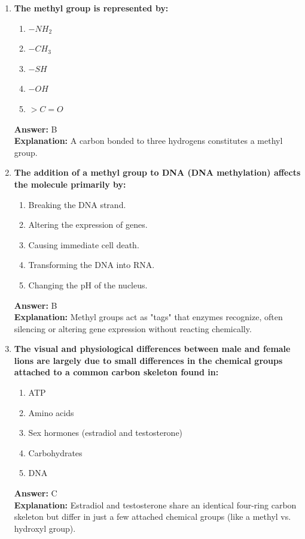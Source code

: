 \documentclass[11pt, a4paper]{article}
\begin{document}
\begin{enumerate}
\item \textbf{The methyl group is represented by:}
\begin{enumerate}[label=\Alph*.]
    \item $-NH_2$
    \item $-CH_3$
    \item $-SH$
    \item $-OH$
    \item $>C=O$
\end{enumerate}
\textbf{Answer:} B \\
\textbf{Explanation:} A carbon bonded to three hydrogens constitutes a methyl group.

\item \textbf{The addition of a methyl group to DNA (DNA methylation) affects the molecule primarily by:}
\begin{enumerate}[label=\Alph*.]
    \item Breaking the DNA strand.
    \item Altering the expression of genes.
    \item Causing immediate cell death.
    \item Transforming the DNA into RNA.
    \item Changing the pH of the nucleus.
\end{enumerate}
\textbf{Answer:} B \\
\textbf{Explanation:} Methyl groups act as "tags" that enzymes recognize, often silencing or altering gene expression without reacting chemically.

\item \textbf{The visual and physiological differences between male and female lions are largely due to small differences in the chemical groups attached to a common carbon skeleton found in:}
\begin{enumerate}[label=\Alph*.]
    \item ATP
    \item Amino acids
    \item Sex hormones (estradiol and testosterone)
    \item Carbohydrates
    \item DNA
\end{enumerate}
\textbf{Answer:} C \\
\textbf{Explanation:} Estradiol and testosterone share an identical four-ring carbon skeleton but differ in just a few attached chemical groups (like a methyl vs. hydroxyl group).



\end{enumerate}
\end{document}
